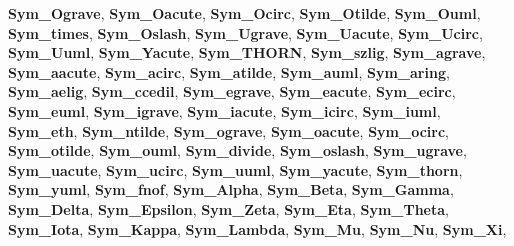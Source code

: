 \begin{DoxyCompactItemize}
{\bfseries Sym\+\_\+\+Ograve}, 
\newline
{\bfseries Sym\+\_\+\+Oacute}, 
{\bfseries Sym\+\_\+\+Ocirc}, 
{\bfseries Sym\+\_\+\+Otilde}, 
{\bfseries Sym\+\_\+\+Ouml}, 
\newline
{\bfseries Sym\+\_\+times}, 
{\bfseries Sym\+\_\+\+Oslash}, 
{\bfseries Sym\+\_\+\+Ugrave}, 
{\bfseries Sym\+\_\+\+Uacute}, 
\newline
{\bfseries Sym\+\_\+\+Ucirc}, 
{\bfseries Sym\+\_\+\+Uuml}, 
{\bfseries Sym\+\_\+\+Yacute}, 
{\bfseries Sym\+\_\+\+T\+H\+O\+RN}, 
\newline
{\bfseries Sym\+\_\+szlig}, 
{\bfseries Sym\+\_\+agrave}, 
{\bfseries Sym\+\_\+aacute}, 
{\bfseries Sym\+\_\+acirc}, 
\newline
{\bfseries Sym\+\_\+atilde}, 
{\bfseries Sym\+\_\+auml}, 
{\bfseries Sym\+\_\+aring}, 
{\bfseries Sym\+\_\+aelig}, 
\newline
{\bfseries Sym\+\_\+ccedil}, 
{\bfseries Sym\+\_\+egrave}, 
{\bfseries Sym\+\_\+eacute}, 
{\bfseries Sym\+\_\+ecirc}, 
\newline
{\bfseries Sym\+\_\+euml}, 
{\bfseries Sym\+\_\+igrave}, 
{\bfseries Sym\+\_\+iacute}, 
{\bfseries Sym\+\_\+icirc}, 
\newline
{\bfseries Sym\+\_\+iuml}, 
{\bfseries Sym\+\_\+eth}, 
{\bfseries Sym\+\_\+ntilde}, 
{\bfseries Sym\+\_\+ograve}, 
\newline
{\bfseries Sym\+\_\+oacute}, 
{\bfseries Sym\+\_\+ocirc}, 
{\bfseries Sym\+\_\+otilde}, 
{\bfseries Sym\+\_\+ouml}, 
\newline
{\bfseries Sym\+\_\+divide}, 
{\bfseries Sym\+\_\+oslash}, 
{\bfseries Sym\+\_\+ugrave}, 
{\bfseries Sym\+\_\+uacute}, 
\newline
{\bfseries Sym\+\_\+ucirc}, 
{\bfseries Sym\+\_\+uuml}, 
{\bfseries Sym\+\_\+yacute}, 
{\bfseries Sym\+\_\+thorn}, 
\newline
{\bfseries Sym\+\_\+yuml}, 
{\bfseries Sym\+\_\+fnof}, 
{\bfseries Sym\+\_\+\+Alpha}, 
{\bfseries Sym\+\_\+\+Beta}, 
\newline
{\bfseries Sym\+\_\+\+Gamma}, 
{\bfseries Sym\+\_\+\+Delta}, 
{\bfseries Sym\+\_\+\+Epsilon}, 
{\bfseries Sym\+\_\+\+Zeta}, 
\newline
{\bfseries Sym\+\_\+\+Eta}, 
{\bfseries Sym\+\_\+\+Theta}, 
{\bfseries Sym\+\_\+\+Iota}, 
{\bfseries Sym\+\_\+\+Kappa}, 
\newline
{\bfseries Sym\+\_\+\+Lambda}, 
{\bfseries Sym\+\_\+\+Mu}, 
{\bfseries Sym\+\_\+\+Nu}, 
{\bfseries Sym\+\_\+\+Xi}, 
\newline

\end{DoxyCompactItemize}
